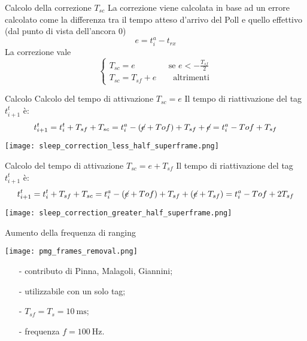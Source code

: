 \begin{frame}{Calcolo della correzione $T_{sc}$}
  La correzione viene calcolata in base ad un errore calcolato come la differenza tra il tempo atteso
  d'arrivo del Poll e quello effettivo (dal punto di vista dell'ancora 0)
  \[
  e = t_{i}^{a} - t_{rx}
  \]
  La correzione vale
  \[
  \begin{cases}
    T_{sc} = e \quad \quad \quad \quad \text{se } e < -\frac{T_{sf}}{2}\\
    T_{sc} = T_{sf} + e \quad \quad \text{altrimenti}
  \end{cases}
  \]
\end{frame}

\begin{frame}{Calcolo Calcolo del tempo di attivazione $T_{sc} = e$}
  Il tempo di riattivazione del tag $t_{i+1}^{t}$ è:
  \[
  t_{i+1}^{t} = t_{i}^{t} + T_{sf} + T_{sc} = t_i^a - (\cancel{e} + Tof) + T_{sf} + \cancel{e} = t_i^a - Tof + T_{sf} 
  \]
  \begin{center}
    \texttt{[image: sleep\_correction\_less\_half\_superframe.png]}
  \end{center}
\end{frame}

\begin{frame}{Calcolo del tempo di attivazione $T_{sc} = e + T_{sf}$}
  Il tempo di riattivazione del tag $t_{i+1}^{t}$ è:
  \[
  t_{i+1}^{t} = t_{i}^{t} + T_{sf} + T_{sc} = t_i^a - (\cancel{e} + Tof) + T_{sf} + (\cancel{e} + T_{sf}) = t_i^a - Tof + 2T_{sf} 
  \]
  \begin{center}
    \texttt{[image: sleep\_correction\_greater\_half\_superframe.png]}
  \end{center}
\end{frame}

\begin{frame}{Aumento della frequenza di ranging}
  \begin{center}
    \texttt{[image: pmg\_frames\_removal.png]}
  \end{center}
      
  \begin{itemize}
  \item[-] contributo di Pinna, Malagoli, Giannini;
  \item[-] utilizzabile con un solo tag;
  \item[-] $T_{sf} = T_s = \SI{10}{\milli\second}$;
  \item[-] frequenza $ f = \SI{100}{\hertz}$.
  \end{itemize}
\end{frame}
